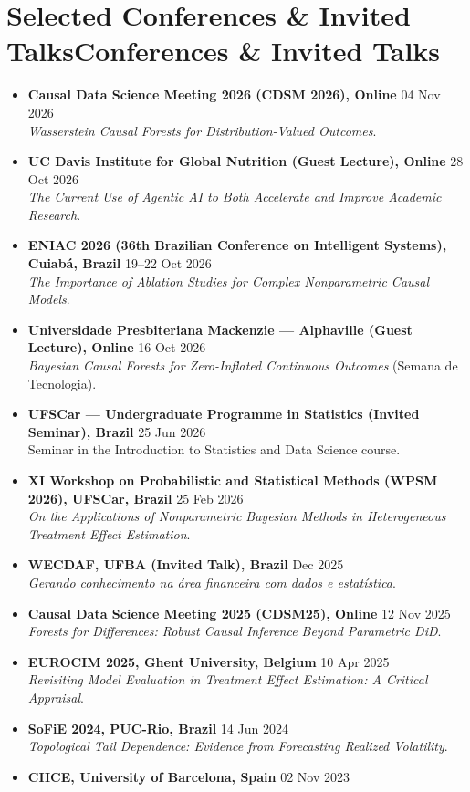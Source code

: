 \documentclass[10pt,a4paper]{article}
\newcommand{\cvitem}[2]{\textbf{#1} \hfill {\small\color{muted}#2}\\}
\begin{document}
\section{\ifshortcv Selected Conferences \& Invited Talks\else Conferences \& Invited Talks\fi}
\begin{itemize}
    \item \cvitem{Causal Data Science Meeting 2026 (CDSM 2026), Online}{04 Nov 2026}
    \textit{Wasserstein Causal Forests for Distribution-Valued Outcomes}.
    \item \cvitem{UC Davis Institute for Global Nutrition (Guest Lecture), Online}{28 Oct 2026}
    \textit{The Current Use of Agentic AI to Both Accelerate and Improve Academic Research}.
    \item \cvitem{ENIAC 2026 (36th Brazilian Conference on Intelligent Systems), Cuiab\'a, Brazil}{19--22 Oct 2026}
    \textit{The Importance of Ablation Studies for Complex Nonparametric Causal Models}.
    \item \cvitem{Universidade Presbiteriana Mackenzie --- Alphaville (Guest Lecture), Online}{16 Oct 2026}
    \textit{Bayesian Causal Forests for Zero-Inflated Continuous Outcomes} (Semana de Tecnologia).
    \ifshortcv\else
    \item \cvitem{UFSCar --- Undergraduate Programme in Statistics (Invited Seminar), Brazil}{25 Jun 2026}
    Seminar in the Introduction to Statistics and Data Science course.
    \item \cvitem{XI Workshop on Probabilistic and Statistical Methods (WPSM 2026), UFSCar, Brazil}{25 Feb 2026}
    \textit{On the Applications of Nonparametric Bayesian Methods in Heterogeneous Treatment Effect Estimation}.
    \item \cvitem{WECDAF, UFBA (Invited Talk), Brazil}{Dec 2025}
    \textit{Gerando conhecimento na \'area financeira com dados e estat\'istica}.
    \item \cvitem{Causal Data Science Meeting 2025 (CDSM25), Online}{12 Nov 2025}
    \textit{Forests for Differences: Robust Causal Inference Beyond Parametric DiD}.
    \item \cvitem{EUROCIM 2025, Ghent University, Belgium}{10 Apr 2025}
    \textit{Revisiting Model Evaluation in Treatment Effect Estimation: A Critical Appraisal}.
    \item \cvitem{SoFiE 2024, PUC-Rio, Brazil}{14 Jun 2024}
    \textit{Topological Tail Dependence: Evidence from Forecasting Realized Volatility}.
    \item \cvitem{CIICE, University of Barcelona, Spain}{02 Nov 2023}

\end{itemize}
\end{document}

